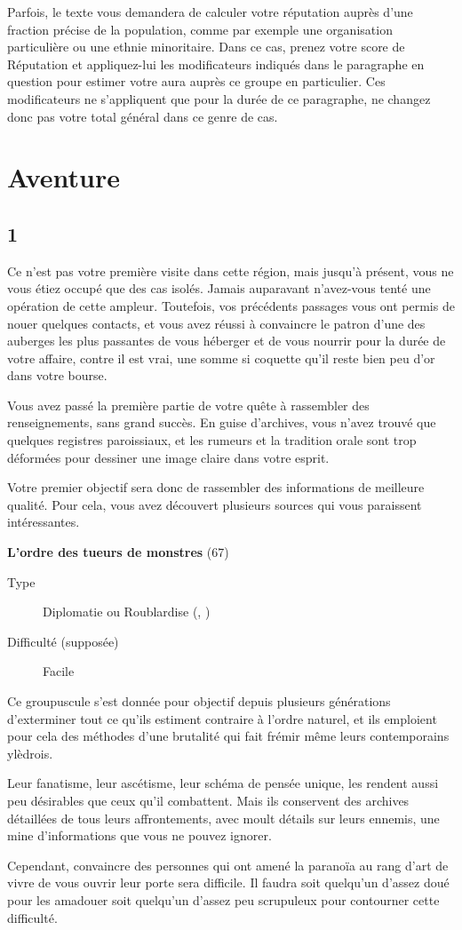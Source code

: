\documentclass{report}
\newcommand{\gsection}[1]{
    \section{#1}
    \label{section-#1}
}
\newcommand{\quest}[5]{
    \begin{mdframed}[innertopmargin=0.5cm,innerbottommargin=0.5cm]
        \begin{center}
            \textbf{#1} (#2)
        \end{center}
        \begin{description}
            \item[Type] #3
            \item[Difficulté (supposée)] #4
        \end{description}
        #5
    \end{mdframed}
}
\begin{document}
Parfois, le texte vous demandera de calculer votre réputation auprès d'une fraction précise de la population, comme par exemple une organisation particulière ou une ethnie minoritaire. Dans ce cas, prenez votre score de Réputation et appliquez-lui les modificateurs indiqués dans le paragraphe en question pour estimer votre aura auprès ce groupe en particulier. Ces modificateurs ne s'appliquent que pour la durée de ce paragraphe, ne changez donc pas votre total général dans ce genre de cas.

\chapter{Aventure}

\gsection{1}

Ce n'est pas votre première visite dans cette région, mais jusqu'à présent, vous ne vous étiez occupé que des cas isolés. Jamais auparavant n'avez-vous tenté une opération de cette ampleur. Toutefois, vos précédents passages vous ont permis de nouer quelques contacts, et vous avez réussi à convaincre le patron d'une des auberges les plus passantes de vous héberger et de vous nourrir pour la durée de votre affaire, contre il est vrai, une somme si coquette qu'il reste bien peu d'or dans votre bourse.

Vous avez passé la première partie de votre quête à rassembler des renseignements, sans grand succès. En guise d'archives, vous n'avez trouvé que quelques registres paroissiaux, et les rumeurs et la tradition orale sont trop déformées pour dessiner une image claire dans votre esprit.

Votre premier objectif sera donc de rassembler des informations de meilleure qualité. Pour cela, vous avez découvert plusieurs sources qui vous paraissent intéressantes.

\quest{L'ordre des tueurs de monstres}{67}{Diplomatie ou Roublardise (\ankh, \cross)}{Facile}{
Ce groupuscule s'est donnée pour objectif depuis plusieurs générations d'exterminer tout ce qu'ils estiment contraire à l'ordre naturel, et ils emploient pour cela des méthodes d'une brutalité qui fait frémir même leurs contemporains ylèdrois.

Leur fanatisme, leur ascétisme, leur schéma de pensée unique, les rendent aussi peu désirables que ceux qu'il combattent. Mais ils conservent des archives détaillées de tous leurs affrontements, avec moult détails sur leurs ennemis, une mine d'informations que vous ne pouvez ignorer.

Cependant, convaincre des personnes qui ont amené la paranoïa au rang d'art de vivre de vous ouvrir leur porte sera difficile. Il faudra soit quelqu'un d'assez doué pour les amadouer soit quelqu'un d'assez peu scrupuleux pour contourner cette difficulté.
}
\end{document}
